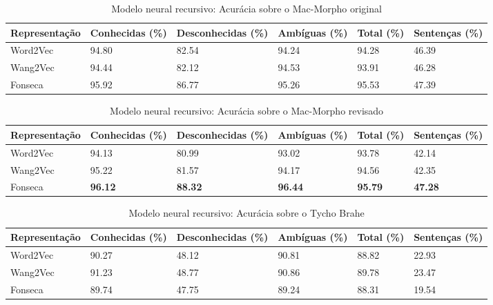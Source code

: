 \begin{table}[!htb]
\footnotesize
\centering
\caption{Modelo neural recursivo: Acurácia sobre o Mac-Morpho original}
\label{tab:acuraciam1_recur}
\begin{tabular}{m{2.5cm}P{2.2cm}P{2.2cm}P{2.2cm}P{2.2cm}P{2.2cm}}
  \toprule
  \textbf{Representação} & \textbf{Conhecidas (\%)}  & \textbf{Desconhecidas (\%)} & \textbf{Ambíguas (\%)} & \textbf{Total (\%)} & \textbf{Sentenças (\%)} \\
  \midrule
  Word2Vec  & 94.80 & 82.54 & 94.24 & 94.28 & 46.39  \\ %
  Wang2Vec  & 94.44 & 82.12 & 94.53 & 93.91 & 46.28  \\
  Fonseca 	& 95.92 & 86.77 & 95.26 & 95.53 & 47.39  \\
  \bottomrule
\end{tabular}
\end{table}


\begin{table}[!htb]
\footnotesize
\centering
\caption{Modelo neural recursivo: Acurácia sobre o Mac-Morpho revisado}
\label{tab:acuraciam3_recur}
\begin{tabular}{m{2.5cm}P{2.2cm}P{2.2cm}P{2.2cm}P{2.2cm}P{2.2cm}}
  \toprule
  \textbf{Representação} & \textbf{Conhecidas (\%)}  & \textbf{Desconhecidas (\%)} & \textbf{Ambíguas (\%)} & \textbf{Total (\%)} & \textbf{Sentenças (\%)} \\
  \midrule
  Word2Vec  & 94.13 & 80.99 & 93.02 & 93.78 & 42.14 \\ %
  Wang2Vec  & 95.22 & 81.57 & 94.17 & 94.56 & 42.35 \\ %
  Fonseca 	& \textbf{96.12} & \textbf{88.32} & \textbf{96.44} & \textbf{95.79} & \textbf{47.28} \\ %
  \bottomrule
\end{tabular}
\end{table}



\begin{table}[!htb]
\footnotesize
\centering
\caption{Modelo neural recursivo: Acurácia sobre o Tycho Brahe}
\label{tab:acuraciatb_recur}
\begin{tabular}{m{2.5cm}P{2.2cm}P{2.2cm}P{2.2cm}P{2.2cm}P{2.2cm}}
  \toprule
  \textbf{Representação} & \textbf{Conhecidas (\%)}  & \textbf{Desconhecidas (\%)} & \textbf{Ambíguas (\%)} & \textbf{Total (\%)} & \textbf{Sentenças (\%)} \\
  \midrule
  Word2Vec  & 90.27 & 48.12 & 90.81 & 88.82 & 22.93  \\ %
  Wang2Vec  & 91.23 & 48.77 & 90.86 & 89.78 & 23.47  \\ %
  Fonseca 	& 89.74 & 47.75 & 89.24 & 88.31 & 19.54  \\ %
  \bottomrule
\end{tabular}
\end{table}


